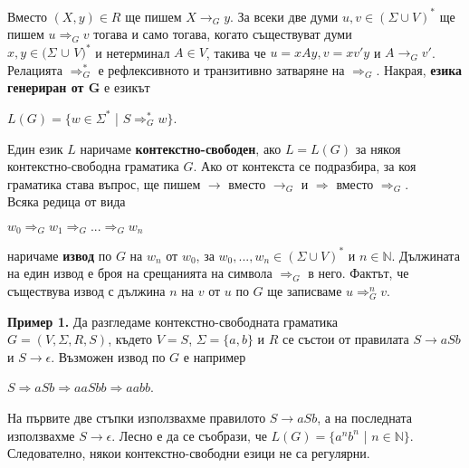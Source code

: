 \documentclass{article}
\begin{document}
    \hspace{15pt}Вместо $(X,y) \in R$ ще пишем $X \rightarrow_G y$. За всеки две думи $u,v \in (\Sigma \cup V)^*$
    ще пишем $u \Rightarrow_G v$ тогава и само тогава, когато съществуват думи \\ $x,y \in (\Sigma$ $\cup$ $V)^*$
    и нетерминал $A \in V$, такива че $u = xAy, v=xv'y$ и $A \rightarrow_G v'$.
    Релацията $\Rightarrow_G^*$ е рефлексивното и транзитивно затваряне на $\Rightarrow_G$.
    Накрая, \textbf{езика генериран от $\boldsymbol{G}$} е езикът 
    \begin{center}
        $L(G) = \{w \in \Sigma^*$ | $S \Rightarrow_G^* w\}$. 
    \end{center}
    \hspace{15pt}Един език $L$ наричаме \textbf{контекстно-свободен}, ако $L = L(G)$ за някоя контекстно-свободна граматика $G$.
    Ако от контекста се подразбира, за коя граматика става въпрос, ще пишем $\rightarrow$ 
    вместо $\rightarrow_G$ и $\Rightarrow$ вместо $\Rightarrow_G$. \\
    \hspace{15pt} Всяка редица от вида
    \begin{center}
        $w_0 \Rightarrow_G w_1 \Rightarrow_G ... \Rightarrow_G w_n$
    \end{center}
    наричаме \textbf{извод} по $G$ на $w_n$ от $w_0$, за $w_0,...,w_n \in (\Sigma \cup V)^*$ и $n \in \mathbb{N}$.
    Дължината на един извод е броя на срещанията на символа $\boxed{\Rightarrow_G}$ в него.
    Фактът, че съществува извод с дължина $n$ на $v$ от $u$ по $G$ ще записваме $u \Rightarrow_G^n v$. 
    \vspace{15pt}

    \textbf{Пример 1.} Да разгледаме контекстно-свободната граматика \\
    $G = (V,\Sigma,R,S)$, където $V = {S}$, $\Sigma = \{a,b\}$ и $R$ се 
    състои от правилата $S \rightarrow aSb$ и $S \rightarrow \epsilon$. Възможен
    извод по $G$ е например
    \begin{center}
        $S \Rightarrow aSb \Rightarrow aaSbb \Rightarrow aabb$.
    \end{center}
    На първите две стъпки използвахме правилото $S \rightarrow aSb$, а на последната
    използвахме $S \rightarrow \epsilon$. Лесно е да се съобрази, че $L(G) = \{a^nb^n$ | $n \in \mathbb{N}\}$.
    Следователно, някои контекстно-свободни езици не са регулярни.

    \vspace{15pt}
\end{document}
